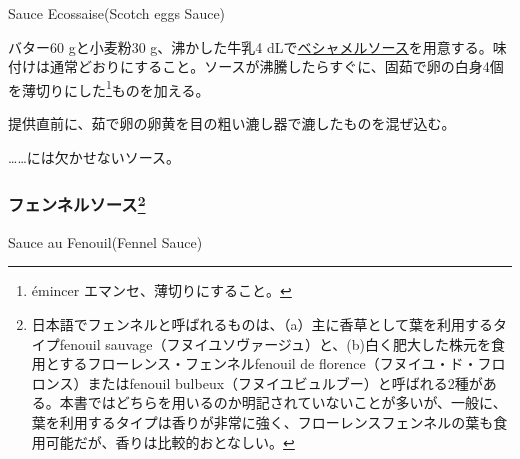 \begin{recette}
\begin{frsubenv}

Sauce Ecossaise\hspace{1em}\normalfont(Scotch eggs Sauce)

\end{frsubenv}


バター60 gと小麦粉30 g、沸かした牛乳4
dLで\protect\hyperlink{sauce-bechamel}{ベシャメルソース}を用意する。味付けは通常どおりにすること。ソースが沸騰したらすぐに、固茹で卵の白身4個を薄切りにした\footnote{émincer
  エマンセ、薄切りにすること。}ものを加える。

提供直前に、茹で卵の卵黄を目の粗い漉し器で漉したものを混ぜ込む。

\ldots{}\ldots{}には欠かせないソース。

\atoaki{}

\hypertarget{fennel-sauce}{%
\subsubsection[フェンネルソース]{\texorpdfstring{フェンネルソース\footnote{日本語でフェンネルと呼ばれるものは、（a）主に香草として葉を利用するタイプfenouil
  sauvage（フヌイユソヴァージュ）と、(b)白く肥大した株元を食用とするフローレンス・フェンネルfenouil
  de florence（フヌイユ・ド・フロロンス）またはfenouil
  bulbeux（フヌイユビュルブー）と呼ばれる2種がある。本書ではどちらを用いるのか明記されていないことが多いが、一般に、葉を利用するタイプは香りが非常に強く、フローレンスフェンネルの葉も食用可能だが、香りは比較的おとなしい。}}{フェンネルソース}}\label{fennel-sauce}}

\begin{frsubenv}

Sauce au Fenouil\hspace{1em}\normalfont(Fennel Sauce)

\end{frsubenv}


\end{recette}
